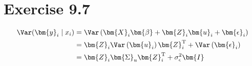 \section*{Exercise 9.7}
\begin{align*}
\Var(\bm{y}_{i} \mid x_i) &= \Var\left(\bm{X}_{i}\bm{\beta} + \bm{Z}_{i}\bm{u}_{i} + \bm{\epsilon}_{i}\right)\\
&= \bm{Z}_{i}\Var\left(\bm{u}_{i}\right)\bm{Z}_{i}^{\rm T} + \Var\left(\bm{\epsilon}_{i}\right)\\
&= \bm{Z}_{i}\bm{\Sigma}_{u}\bm{Z}_{i}^{\rm T} + \sigma_{\epsilon}^{2}\bm{I}\\
\end{align*}
